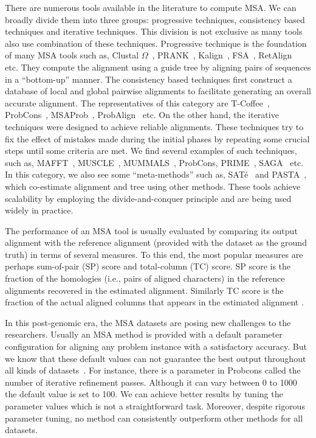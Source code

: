There are numerous tools available in the literature to compute MSA. We can broadly divide them into three groups: progressive techniques, consistency based techniques and iterative techniques. This division is not exclusive as many tools also use combination of these techniques. Progressive technique is the foundation of many MSA tools such as, Clustal $\Omega$~\citep{sievers2011fast}, PRANK~\citep{loytynoja2005algorithm}, Kalign~\citep{lassmann2008kalign2}, FSA~\citep{bradley2009fast}, RetAlign~\citep{szabo2010reticular} etc. They compute the alignment using a guide tree by aligning pairs of sequences in a ``bottom-up'' manner. The consistency based techniques first construct a database of  local and global pairwise alignments to facilitate generating an overall accurate alignment. The representatives of this category are T-Coffee~\citep{notredame2000t}, ProbCons~\citep{do2005probcons}, MSAProb~\citep{liu2010msaprobs}, ProbAlign~\citep{roshan2006probalign} etc. On the other hand, the iterative techniques were designed to achieve reliable alignments. These techniques try to fix the effect of mistakes made during the initial phases by repeating some crucial steps until some criteria are met. We find several examples of such techniques, such as, MAFFT~\citep{katoh2002mafft}, MUSCLE~\citep{edgar2004muscle}, MUMMALS~\citep{pei2006mummals}, ProbCons, PRIME~\citep{yamada2006improvement}, SAGA~\citep{notredame1996saga} etc. In this category, we also see some ``meta-methods'' such as, SAT\'e~\citep{liu2009rapid} and PASTA~\citep{mirarab2015pasta}, which co-estimate alignment and tree using other methods. These tools achieve scalability by employing the divide-and-conquer principle and are being used widely in practice.

The performance of an MSA tool is usually evaluated by comparing its output alignment with the reference alignment (provided with the dataset as the ground truth) in terms of several measures. To this end, the most popular measures are perhaps sum-of-pair (SP) score and total-column (TC) score. SP score is the fraction of the homologies (i.e., pairs of aligned characters) in the reference alignments recovered in the estimated alignment. Similarly TC score is the fraction of the actual aligned columns that appears in the estimated alignment .

In this post-genomic era, the MSA datasets are posing new challenges to the researchers. Usually an MSA method is provided with a default parameter configuration for aligning any problem instance with a satisfactory accuracy. But we know that these default values can not guarantee the best output throughout all kinds of datasets~\citep{rubio2018characteristic}. For instance, there is a parameter in Probcons called the number of iterative refinement passes. Although it can vary between 0 to 1000 the default value is set to 100. We can achieve better results by tuning the parameter values which is not a straightforward task. Moreover, despite rigorous parameter tuning, no method can consistently outperform other methods for all datasets. 

